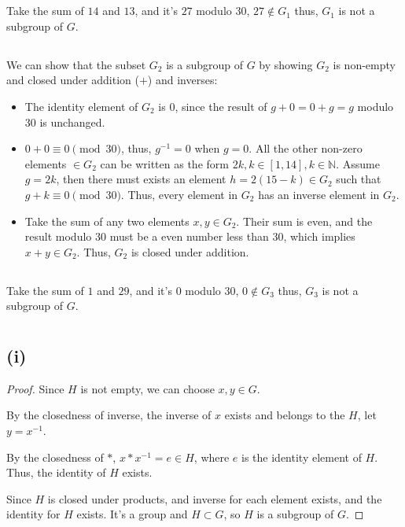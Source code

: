 \documentclass[12pt]{article}
\title{\mytitle}
\author{\textbf{\myauthor}}
\date{Due: 24th September 2025}
\begin{document}
\onehalfspacing
\maketitle

\section{} %
\subsection{} %
Take the sum of $14$ and $13$, and it's $27$ modulo $30$, $27\notin G_1$ thus, $G_1$ is not a subgroup of $G$.
\subsection{} %
We can show that the subset $G_2$ is a subgroup of $G$ by showing $G_2$ is non-empty and closed under addition ($+$) and inverses:
\begin{itemize}
    \item The identity element of $G_2$ is 0, since the result of $g+0=0+g=g$ modulo $30$ is unchanged.
    \item $0+0\equiv 0\pmod{30}$, thus, $g^{-1}=0$ when $g=0$. All the other non-zero elements $\in G_2$ can be written as the form $2k,k\in[1,14],k\in\mathbb{N}$. Assume $g=2k$, then there must exists an element $h=2(15-k)\in G_2$ such that $g+k\equiv 0\pmod{30}$. Thus, every element in $G_2$ has an inverse element in $G_2$.
    \item Take the sum of any two elements $x,y\in G_2$. Their sum is even, and the result modulo 30 must be a even number less than 30, which implies $x+y\in G_2$. Thus, $G_2$ is closed under addition.
\end{itemize}
\subsection{} %
Take the sum of $1$ and $29$, and it's $0$ modulo $30$, $0\notin G_3$ thus, $G_3$ is not a subgroup of $G$.





\newpage
\section{} %
\subsection*{(i)}
\begin{proof}
Since $H$ is not empty, we can choose $x,y\in G$.

By the closedness of inverse, the inverse of $x$ exists and belongs to the $H$, let $y=x^{-1}$.

By the closedness of $*$, $x*x^{-1}=e\in H$, where $e$ is the identity element of $H$. Thus, the identity of $H$ exists.

Since $H$ is closed under products, and inverse for each element exists, and the identity for $H$ exists. It's a group and $H\subset G$, so $H$ is a subgroup of $G$.
\end{proof}
\end{document}
